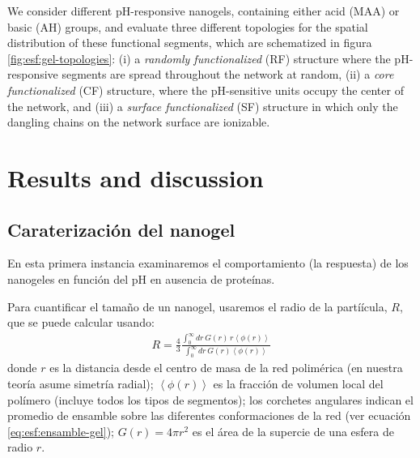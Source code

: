 We consider different pH-responsive nanogels, containing either acid (MAA) or basic (AH) groups, and evaluate three different topologies for the spatial distribution of these functional  segments, which are schematized in figura \ref{fig:esf:gel-topologies}: 
(i) a \emph{randomly functionalized} (RF) structure where the pH-responsive segments are spread throughout the network  at random,
(ii) a \emph{core functionalized} (CF) structure, where the  pH-sensitive units occupy the center of the network, and 
(iii) a \emph{surface functionalized} (SF) structure in which only the dangling chains on the network surface  are ionizable. 

 
 
  







\section{Results and discussion}






\subsection{Caraterizaci\'on del nanogel}
En esta primera instancia  examinaremos  el comportamiento (la respuesta) de los nanogeles en funci\'on del pH en ausencia de  prote\'inas. 

Para cuantificar el tama\~no de un nanogel, usaremos el radio  de la partí\'icula, $R$, que se puede calcular usando:
\begin{align}
    R= \frac{4}{3}\frac{\int_0^\infty{dr\,G(r)\,r \left<\phi(r)\right>}}{\int_0^\infty{dr\,G(r)\left<\phi(r)\right>}}
\end{align}
donde $r$ es la distancia desde el centro de masa de la red polim\'erica (en nuestra teor\'ia asume simetr\'ia radial);
$\left<\phi(r)\right>$ es la fracci\'on de volumen local del pol\'imero (incluye todos los tipos de segmentos);
los corchetes angulares indican el promedio de ensamble sobre las diferentes conformaciones de la red (ver ecuaci\'on \ref{eq:esf:ensamble-gel});
$G(r)=4\pi r^2$ es el  \'area de la supercie de una esfera de radio $r$.

